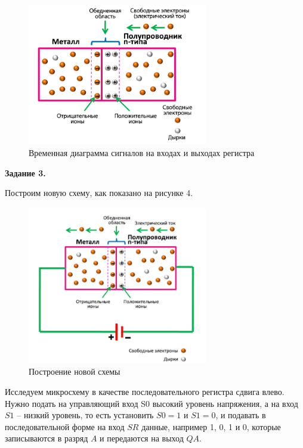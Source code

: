 \documentclass[spec, och, labwork]{shiza}
\begin{document}
  \begin{figure}[H]
    \centering     
    \includegraphics[width=0.7\textwidth]{photo/3}
    \caption{Временная диаграмма сигналов на входах и выходах регистра}
  \end{figure}

  \textbf{Задание 3.}

  Построим новую схему, как показано на рисунке 4.

  \begin{figure}[H]
    \centering     
    \includegraphics[width=0.7\textwidth]{photo/4}
    \caption{Построение новой схемы}
  \end{figure}

  Исследуем микросхему в качестве последовательного регистра сдвига влево. Нужно подать на управляющий вход S0 высокий уровень напряжения, а на вход $S1$ – низкий уровень, то есть установить $S0 = 1$ и $S1 = 0$, и подавать в последовательной форме на вход $SR$ данные, например 1, 0, 1 и 0, которые записываются в разряд $A$ и передаются на выход $QA$.
\end{document}
